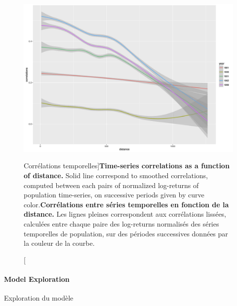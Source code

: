 \begin{figure}
\includegraphics[width=\linewidth]{Figures/Final/4-3-2-fig-interactiongibrat-ts-correlations}
\caption[Time-series correlations][Corrélations temporelles]{\textbf{Time-series correlations as a function of distance.} Solid line correspond to smoothed correlations, computed between each pairs of normalized log-returns of population time-series, on successive periods given by curve color.\label{fig:interactiongibrat:ts-correlations}}{\textbf{Corrélations entre séries temporelles en fonction de la distance.} Les lignes pleines correspondent aux corrélations lissées, calculées entre chaque paire des log-returns normalisés des séries temporelles de population, sur des périodes successives données par la couleur de la courbe.\label{fig:interactiongibrat:ts-correlations}}
\end{figure}





\paragraph{Model Exploration}{Exploration du modèle}




